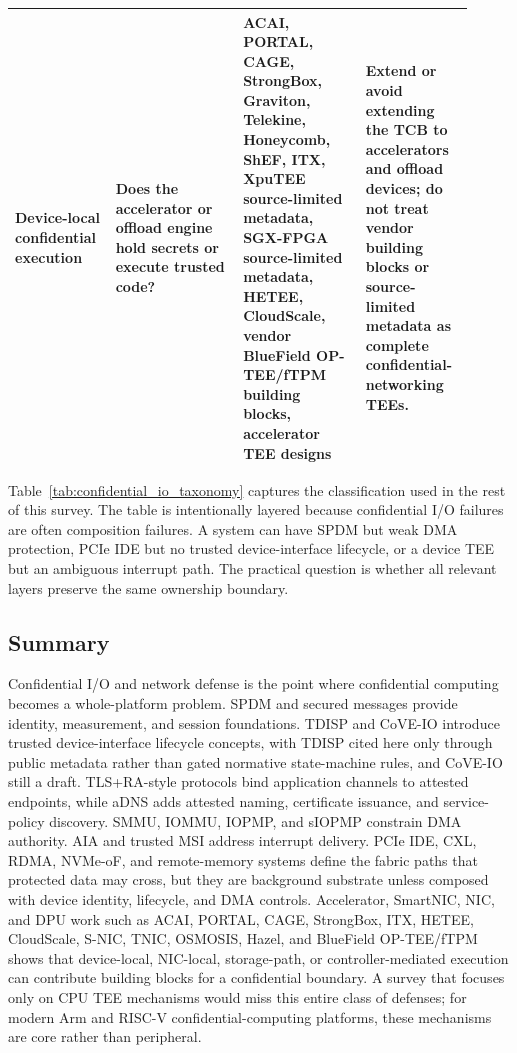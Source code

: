 \begin{table}[t]
\begin{tabular}{@{}p{0.18\linewidth}p{0.26\linewidth}p{0.25\linewidth}p{0.22\linewidth}@{}}
Device-local confidential execution & Does the accelerator or offload engine hold secrets or execute trusted code? & ACAI, PORTAL, CAGE, StrongBox, Graviton, Telekine, Honeycomb, ShEF, ITX, XpuTEE source-limited metadata, SGX-FPGA source-limited metadata, HETEE, CloudScale, vendor BlueField OP-TEE/fTPM building blocks, accelerator TEE designs & Extend or avoid extending the TCB to accelerators and offload devices; do not treat vendor building blocks or source-limited metadata as complete confidential-networking TEEs. \\ \bottomrule
\end{tabular}
\end{table}

Table~\ref{tab:confidential_io_taxonomy} captures the classification used in
the rest of this survey. The table is intentionally layered because
confidential I/O failures are often composition failures. A system can have
SPDM but weak DMA protection, PCIe IDE but no trusted device-interface
lifecycle, or a device TEE but an ambiguous interrupt path. The practical
question is whether all relevant layers preserve the same ownership boundary.

\subsection{Summary}

Confidential I/O and network defense is the point where confidential computing
becomes a whole-platform problem. SPDM and secured messages provide identity,
measurement, and session foundations. TDISP and CoVE-IO introduce trusted
device-interface lifecycle concepts, with TDISP cited here only through public
metadata rather than gated normative state-machine rules, and CoVE-IO still a
draft. TLS+RA-style protocols bind application channels to attested endpoints,
while aDNS adds attested naming, certificate issuance, and service-policy
discovery.
SMMU, IOMMU, IOPMP, and sIOPMP constrain DMA
authority. AIA and trusted MSI address interrupt delivery. PCIe IDE, CXL, RDMA,
NVMe-oF, and remote-memory systems define the fabric paths that protected data
may cross, but they are background substrate unless composed with device
identity, lifecycle, and DMA controls. Accelerator, SmartNIC, NIC, and DPU work
such as ACAI, PORTAL, CAGE, StrongBox, ITX, HETEE, CloudScale, S-NIC, TNIC,
OSMOSIS, Hazel, and BlueField OP-TEE/fTPM shows that device-local, NIC-local,
storage-path, or controller-mediated execution can contribute building blocks
for a confidential boundary. A survey that focuses only on CPU TEE mechanisms
would miss this entire class of
defenses; for modern Arm and RISC-V confidential-computing platforms, these
mechanisms are core rather than peripheral.

